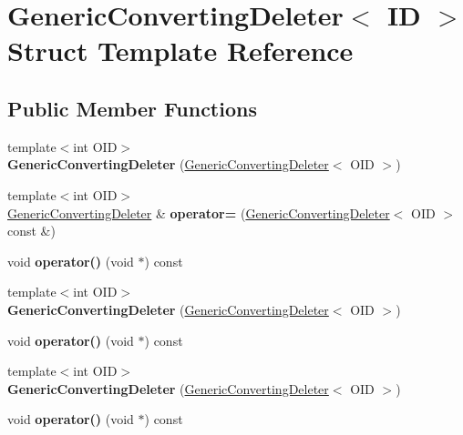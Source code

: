 \hypertarget{struct_generic_converting_deleter}{}\section{Generic\+Converting\+Deleter$<$ ID $>$ Struct Template Reference}
\label{struct_generic_converting_deleter}
\subsection*{Public Member Functions}
\begin{DoxyCompactItemize}
\item 
\mbox{\label{struct_generic_converting_deleter_a803f0ac4a7e8edd9c5f378be4b8216f1}} 
{\footnotesize template$<$int O\+ID$>$ }\\{\bfseries Generic\+Converting\+Deleter} (\mbox{\hyperlink{struct_generic_converting_deleter}{Generic\+Converting\+Deleter}}$<$ O\+ID $>$)
\item 
\mbox{\label{struct_generic_converting_deleter_ad94e0fa8fc5094cd1ebe459c6e29cb1f}} 
{\footnotesize template$<$int O\+ID$>$ }\\\mbox{\hyperlink{struct_generic_converting_deleter}{Generic\+Converting\+Deleter}} \& {\bfseries operator=} (\mbox{\hyperlink{struct_generic_converting_deleter}{Generic\+Converting\+Deleter}}$<$ O\+ID $>$ const \&)
\item 
\mbox{\label{struct_generic_converting_deleter_aaa4b4e740ffe865d08fbc56f25585069}} 
void {\bfseries operator()} (void $\ast$) const
\item 
\mbox{\label{struct_generic_converting_deleter_a803f0ac4a7e8edd9c5f378be4b8216f1}} 
{\footnotesize template$<$int O\+ID$>$ }\\{\bfseries Generic\+Converting\+Deleter} (\mbox{\hyperlink{struct_generic_converting_deleter}{Generic\+Converting\+Deleter}}$<$ O\+ID $>$)
\item 
\mbox{\label{struct_generic_converting_deleter_aaa4b4e740ffe865d08fbc56f25585069}} 
void {\bfseries operator()} (void $\ast$) const
\item 
\mbox{\label{struct_generic_converting_deleter_a803f0ac4a7e8edd9c5f378be4b8216f1}} 
{\footnotesize template$<$int O\+ID$>$ }\\{\bfseries Generic\+Converting\+Deleter} (\mbox{\hyperlink{struct_generic_converting_deleter}{Generic\+Converting\+Deleter}}$<$ O\+ID $>$)
\item 
\mbox{\label{struct_generic_converting_deleter_aaa4b4e740ffe865d08fbc56f25585069}} 
void {\bfseries operator()} (void $\ast$) const
\end{DoxyCompactItemize}


